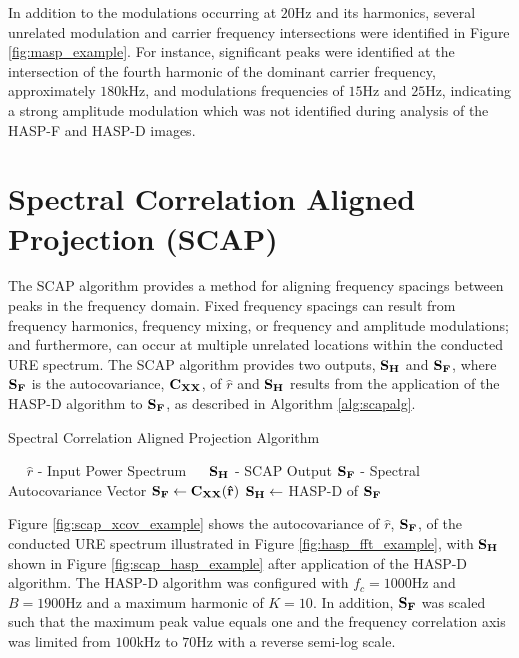 In addition to the modulations occurring at $20$Hz and its harmonics, several unrelated modulation and carrier frequency intersections were identified in Figure \ref{fig:masp_example}.  For instance, significant peaks were identified at the intersection of the fourth harmonic of the dominant carrier frequency, approximately $180$kHz, and modulations frequencies of $15$Hz and $25$Hz, indicating a strong amplitude modulation which was not identified during analysis of the HASP-F and HASP-D images.

\section[Spectral Correlation Aligned Projection (SCAP)]{Spectral Correlation Aligned Projection (SCAP)}
\label{Spectral Correlation Aligned Projection}

The SCAP algorithm provides a method for aligning frequency spacings between peaks in the frequency domain.  Fixed frequency spacings can result from frequency harmonics, frequency mixing, or frequency and amplitude modulations; and furthermore, can occur at multiple unrelated locations within the conducted URE spectrum. The SCAP algorithm provides two outputs, $\bf{S}_H$ and $\bf{S}_F$, where $\bf{S}_F$ is the autocovariance, $\bf{C}_{XX}$, of $\hat{r}$ and $\bf{S}_H$ results from the application of the HASP-D algorithm to $\bf{S}_F$, as described in Algorithm \ref{alg:scapalg}. 

\begin{algorithm}
	\caption{Spectral Correlation Aligned Projection Algorithm} \label{alg:scapalg}
	\scriptsize
	\begin{algorithmic}[1]
		\Require~~
		\Statex $\hat{r}$ - Input Power Spectrum
		\Ensure~~
		\Statex $\bf{S}_H$ - SCAP Output
		\Statex $\bf{S}_F$ - Spectral Autocovariance Vector 
		\Statex
		\State $\bf{S}_F \gets \bf{C}_{XX}(\hat{r})$
		\State $\bf{S}_H \gets $ HASP-D of $\bf{S}_F$ 
	\end{algorithmic}
\end{algorithm}

Figure \ref{fig:scap_xcov_example} shows the autocovariance of $\hat{r}$, $\bf{S}_F$, of the conducted URE spectrum illustrated in Figure \ref{fig:hasp_fft_example}, with $\bf{S}_H$ shown in Figure \ref{fig:scap_hasp_example} after application of the HASP-D algorithm.  The HASP-D algorithm was configured with $f_c = 1000$Hz and $B = 1900$Hz and a maximum harmonic of $K = 10$.  In addition, $\bf{S}_F$ was scaled such that the maximum peak value equals one and the frequency correlation axis was limited from $100$kHz to $70$Hz with a reverse semi-log scale.

